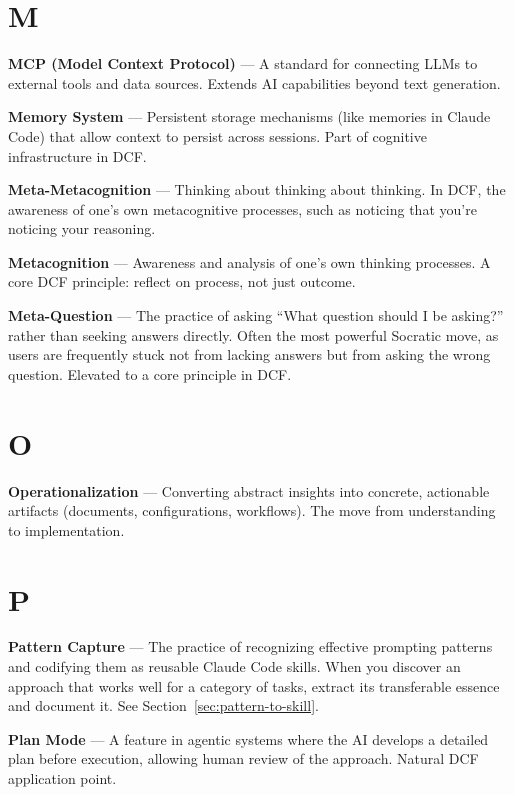 \section*{M}

\textbf{MCP (Model Context Protocol)} --- A standard for connecting LLMs to external tools and data sources. Extends AI capabilities beyond text generation.

\textbf{Memory System} --- Persistent storage mechanisms (like memories in Claude Code) that allow context to persist across sessions. Part of cognitive infrastructure in DCF.

\textbf{Meta-Metacognition} --- Thinking about thinking about thinking. In DCF, the awareness of one's own metacognitive processes, such as noticing that you're noticing your reasoning.

\textbf{Metacognition} --- Awareness and analysis of one's own thinking processes. A core DCF principle: reflect on process, not just outcome.

\textbf{Meta-Question} --- The practice of asking ``What question should I be asking?'' rather than seeking answers directly. Often the most powerful Socratic move, as users are frequently stuck not from lacking answers but from asking the wrong question. Elevated to a core principle in DCF.

\section*{O}

\textbf{Operationalization} --- Converting abstract insights into concrete, actionable artifacts (documents, configurations, workflows). The move from understanding to implementation.

\section*{P}

\textbf{Pattern Capture} --- The practice of recognizing effective prompting patterns and codifying them as reusable Claude Code skills. When you discover an approach that works well for a category of tasks, extract its transferable essence and document it. See Section~\ref{sec:pattern-to-skill}.

\textbf{Plan Mode} --- A feature in agentic systems where the AI develops a detailed plan before execution, allowing human review of the approach. Natural DCF application point.

